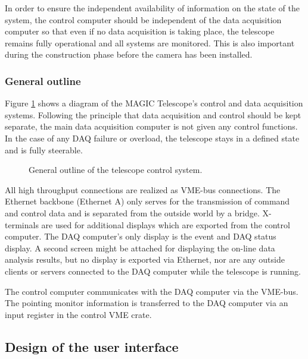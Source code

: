 
\medskip In order to ensure the independent availability of information on
the state of the system, the control computer should be independent of the
data acquisition computer so that even if no data acquisition is taking
place, the telescope remains fully operational and all systems are
monitored. This is also important during the construction phase before the
camera has been installed.

\subsubsection{General outline}

Figure \ref{fig-control} shows a diagram of the MAGIC Telescope's control and data
acquisition systems. Following the principle that data acquisition and
control should be kept separate, the main data acquisition computer is not
given any control functions. In the case of any DAQ failure or overload, the
telescope stays in a defined state and is fully steerable.

\begin{figure}[p]
\begin{center}
\vspace{-2cm}
\caption{ General outline of the telescope control system.}
\label{fig-control}
\end{center}
\end{figure}

All high throughput connections are realized as VME-bus connections. The
Ethernet backbone (Ethernet A) only serves for the transmission of command
and control data and is separated from the outside world by a bridge.
X-terminals are used for additional displays which are exported from the
control computer. The DAQ computer's only display is the event and DAQ
status display. A second screen might be attached for displaying the on-line
data analysis results, but no display is exported via Ethernet, nor are any
outside clients or servers connected to the DAQ computer while the telescope
is running.

The control computer communicates with the DAQ computer via the VME-bus. The
pointing monitor information is transferred to the DAQ computer via an input
register in the control VME crate.

\subsection{Design of the user interface}

